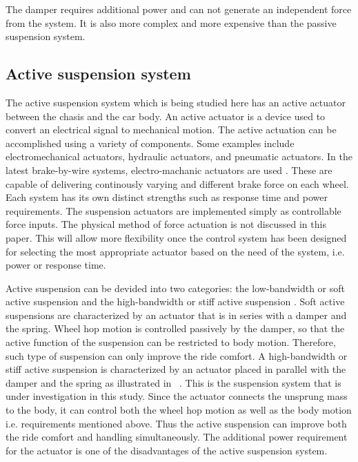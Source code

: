\documentclass[10pt,twocolumn]{witseiepaper}
\begin{document}
The damper requires additional power and can not generate an independent force from the system. It is also more complex and more expensive than the passive suspension system.

\subsection{Active suspension system} 

The active suspension system which is being studied here has an active actuator between the chasis and the car body. An active actuator is a device used to convert an electrical signal to mechanical motion. The active actuation can be accomplished using a variety of components. Some examples include electromechanical actuators, hydraulic actuators, and pneumatic actuators. In the latest brake-by-wire systems, electro-machanic actuators are used \cite{Ghita:2008}. These are capable of delivering continously varying and different brake force on each wheel. Each system has its own distinct strengths such as response time and power requirements. The suspension actuators are implemented simply as controllable force inputs. The physical method of force actuation is not discussed in this paper. This will allow more flexibility once the control system has been designed for selecting the most appropriate actuator based on the need of the system, i.e. power or response time. 

Active suspension can be devided into two categories: the low-bandwidth or soft active suspension and the high-bandwidth or stiff active suspension \cite{Crolla:1988}. Soft active suspensions are characterized by an actuator that is in series with a damper and the spring. Wheel hop motion is controlled passively by the damper, so that the active function of the suspension can be restricted to body motion. Therefore, such type of suspension can only improve the ride comfort. A high-bandwidth or stiff active suspension is characterized by an actuator placed in parallel with the damper and the spring as illustrated in ~. This is the suspension system that is under investigation in this study. Since the actuator connects the unsprung mass to the body, it can control both the wheel hop motion as well as the body motion \cite{Williams:1994, Wright:1984} i.e. requirements mentioned above. Thus the active suspension can improve both the ride comfort and handling simultaneously. The additional power requirement for the actuator is one of the disadvantages of the active suspension system. 
 
\end{document}

